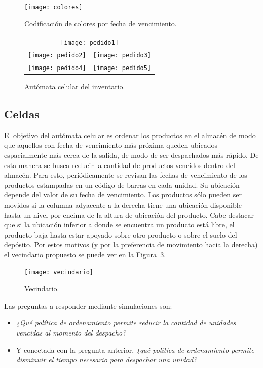 \documentclass[10pt]{article}
\begin{document}
 \begin{figure}[h] 
 	\centering 
 	\texttt{[image: colores]} 
 	\caption{Codificación de colores por fecha de vencimiento.} 
 	\label{fig:AC-colores} 
 \end{figure}
 
 \begin{figure}[h] 
 \centering
 
 	\begin{tabular}{cc}
 		\multicolumn{2}{c}{\texttt{[image: pedido1]}}\\[5mm]
 		\texttt{[image: pedido2]} &
 		\texttt{[image: pedido3]} \\[5mm]
 		\texttt{[image: pedido4]} &
 		\texttt{[image: pedido5]} \\
 	\end{tabular}
 	
 	\caption{Autómata celular del inventario.} 
 	\label{fig:AC-inventario} 
 \end{figure}
 \FloatBarrier
 
\subsection{Celdas}

El objetivo del autómata celular es ordenar los productos en el almacén de modo que aquellos con fecha de vencimiento más próxima queden ubicados espacialmente más cerca de la salida, de modo de ser despachados más rápido. De esta manera se busca reducir la cantidad de productos vencidos dentro del almacén. Para esto, periódicamente se revisan las fechas de vencimiento de los productos estampadas en un código de barras en cada unidad. Su ubicación depende del valor de su fecha de vencimiento. Los productos sólo pueden ser movidos si la columna adyacente a la derecha tiene una ubicación disponible hasta un nivel por encima de la altura de ubicación del producto.
Cabe destacar que si la ubicación inferior a donde se encuentra un producto está libre, el producto baja hasta estar apoyado sobre otro producto o sobre el suelo del depósito.
Por estos motivos (y por la preferencia de movimiento hacia la derecha) el vecindario propuesto se puede ver en la Figura~\ref{fig:AC-vecindario}.

\begin{figure}[h] 
  \centering 
  \texttt{[image: vecindario]} 
  \caption{Vecindario.} 
  \label{fig:AC-vecindario} 
\end{figure}
\FloatBarrier

Las preguntas a responder mediante simulaciones son:
\begin{itemize}
\item \textit{¿Qué política de ordenamiento permite reducir la cantidad de unidades vencidas al momento del despacho?}
\item Y conectada con la pregunta anterior, \textit{¿qué política de ordenamiento permite disminuir el tiempo necesario para despachar una unidad?}
\end{itemize}
\end{document}
